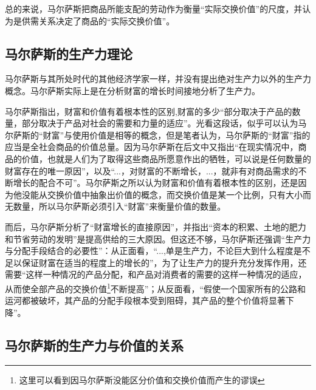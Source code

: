 总的来说，马尔萨斯把商品所能支配的劳动作为衡量“实际交换价值”的尺度，并认为是供需关系决定了商品的“实际交换价值”。

\subsection{马尔萨斯的生产力理论}

马尔萨斯与其所处时代的其他经济学家一样，并没有提出绝对生产力以外的生产力概念。马尔萨斯实际上是在分析财富的增长时间接地分析了生产力。

马尔萨斯指出，财富和价值有着根本性的区别,财富的多少“部分取决于产品的数量，部分取决于产品对社会的需要和力量的适应”\cite[292]{BiLuo*SiLaFaDaWeiLiJiaTuQuanJiDi2JuanMaErSaSiZhengZhiJingJiXueYuanLiPingZhu2013}。光看这段话，似乎可以认为马尔萨斯的“财富”与使用价值是相等的概念，但是笔者认为，马尔萨斯的“财富”指的应当是全社会商品的价值总量。因为马尔萨斯在后文中又指出“在现实情况中，商品的价值，也就是人们为了取得这些商品所愿意作出的牺牲，可以说是任何数量的财富存在的唯一原因”\cite[292]{BiLuo*SiLaFaDaWeiLiJiaTuQuanJiDi2JuanMaErSaSiZhengZhiJingJiXueYuanLiPingZhu2013}，以及“...，对财富的不断增长，...，就非有对商品需求的不断增长的配合不可”\cite[355]{BiLuo*SiLaFaDaWeiLiJiaTuQuanJiDi2JuanMaErSaSiZhengZhiJingJiXueYuanLiPingZhu2013}。马尔萨斯之所以认为财富和价值有着根本性的区别，还是因为他没能从交换价值中抽象出价值的概念，而交换价值是某一个比例，只有大小而无数量，所以马尔萨斯必须引入“财富”来衡量价值的数量。

而后，马尔萨斯分析了“财富增长的直接原因”，并指出“资本的积累、土地的肥力和节省劳动的发明”是提高供给的三大原因\cite[text]{BiLuo*SiLaFaDaWeiLiJiaTuQuanJiDi2JuanMaErSaSiZhengZhiJingJiXueYuanLiPingZhu2013}。但这还不够，马尔萨斯还强调“生产力与分配手段结合的必要性”\cite[356]{BiLuo*SiLaFaDaWeiLiJiaTuQuanJiDi2JuanMaErSaSiZhengZhiJingJiXueYuanLiPingZhu2013}：从正面看，“...,单是生产力，不论巨大到什么程度是不足以保证财富在适当的程度上的增长的”，为了让生产力的提升充分发挥作用，还需要“这样一种情况的产品分配，和产品对消费者的需要的这样一种情况的适应，从而使全部产品的交换价值\footnote{这里可以看到因马尔萨斯没能区分价值和交换价值而产生的谬误}不断提高”\cite[356]{BiLuo*SiLaFaDaWeiLiJiaTuQuanJiDi2JuanMaErSaSiZhengZhiJingJiXueYuanLiPingZhu2013}；从反面看，“假使一个国家所有的公路和运河都被破坏，其产品的分配手段根本受到阻碍，其产品的整个价值将显著下降”\cite[357]{BiLuo*SiLaFaDaWeiLiJiaTuQuanJiDi2JuanMaErSaSiZhengZhiJingJiXueYuanLiPingZhu2013}。

\subsection{马尔萨斯的生产力与价值的关系}

